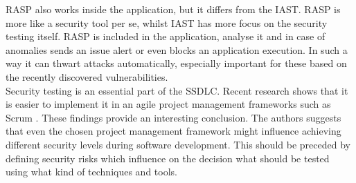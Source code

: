 \documentclass{article} %
\begin{document}
RASP also works inside the application, but it differs from the IAST. RASP is more like a security tool per se, whilst IAST has more focus on the security testing itself. RASP is included in the application, analyse it and in case of anomalies sends an issue alert or even blocks an application execution. In such a way it can thwart attacks automatically, especially important for these based on the recently discovered vulnerabilities.\\
\newline
Security testing is an essential part of the SSDLC. Recent research shows that it is easier to implement it in an agile project management frameworks such as Scrum \cite{bib:framework_for_scrum, bib:pentesting_in_agile}. These findings provide an interesting conclusion. The authors suggests that even the chosen project management framework might influence achieving different security levels during software development. This should be preceded by defining security risks which influence on the decision what should be tested using what kind of techniques and tools.
\end{document}
